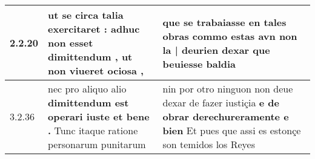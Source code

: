 \begin{tabular}{|p{1cm}|p{6.5cm}|p{6.5cm}|}

\hline
2.2.20 & ut se circa talia exercitaret : \textbf{ adhuc non esset dimittendum , } ut non viueret ociosa , & que se trabaiasse en tales obras \textbf{ commo estas avn non la | deurien dexar } que beuiesse baldia \\\hline
3.2.36 & nec pro aliquo alio \textbf{ dimittendum est operari iuste et bene . } Tunc itaque ratione personarum punitarum & nin por otro ninguon non deue dexar de fazer iustiçia \textbf{ e de obrar derechureramente e bien } Et pues que assi es estonçe son temidos los Reyes \\\hline

\end{tabular}
